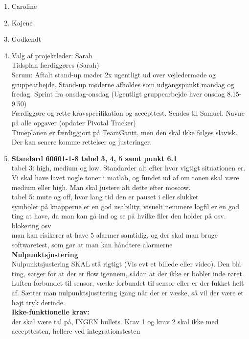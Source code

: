 \begin{enumerate}
	\item Caroline
	\item Kajene
	\item Godkendt
	\item Valg af projektleder: Sarah \\
	Tidsplan færdiggøres (Sarah) \\
	Scrum: Aftalt stand-up møder 2x ugentligt ud over vejledermøde og gruppearbejde. Stand-up møderne afholdes som udgangspunkt mandag og fredag. Sprint fra onsdag-onsdag (Ugentligt gruppearbejde hver onsdag 8.15-9.50)\\
	Færdiggøre og rette kravspecifikation og accepttest. Sendes til Samuel. Navne på alle opgaver (opdater Pivotal Tracker)\\
	Timeplanen er færdiggjort på TeamGantt, men den skal ikke følges slavisk. Der kan senere komme rettelser og justeringer. \\
	
	\item \textbf{Standard 60601-1-8 tabel 3, 4, 5 samt punkt 6.1} \\ tabel 3: high, medium og low. Standarder alt efter hvor vigtigt situationen er. Vi skal have lavet nogle toner i matlab, og fundet ud af om tonen skal være medium eller high. Man skal justere alt dette efter moscow. \\
	tabel 5: mute og off, hvor lang tid den er pauset i eller slukket \\
	symboler på knapperne er en god usability, visuelt nemmere logfil er en god ting at have, da man kan gå ind og se på hvilke filer den holder på osv. blokering osv \\
	man kan risikerer at have 5 alarmer samtidig, og der skal man bruge softwaretest, som gør at man kan håndtere alarmerne \\
	
	\textbf{Nulpunktsjustering} \\ Nulpunktsjustering SKAL stå rigtigt (Vis evt et billede eller video). Den blå ting, sørger for at der er flow igennem, sådan at der ikke er bobler inde røret. Luften forbundet til sensor, væske forbundet til sensor eller er der lukket helt af. Sætter man nulpunktsjusttering igang når der er væske, så vil der være et højt tryk derinde. \\
	
	\textbf{Ikke-funktionelle krav:} \\ der skal være tal på, INGEN bullets. Krav 1 og krav 2 skal ikke med accepttesten, hellere ved integrationstesten \\
	

\end{enumerate}
